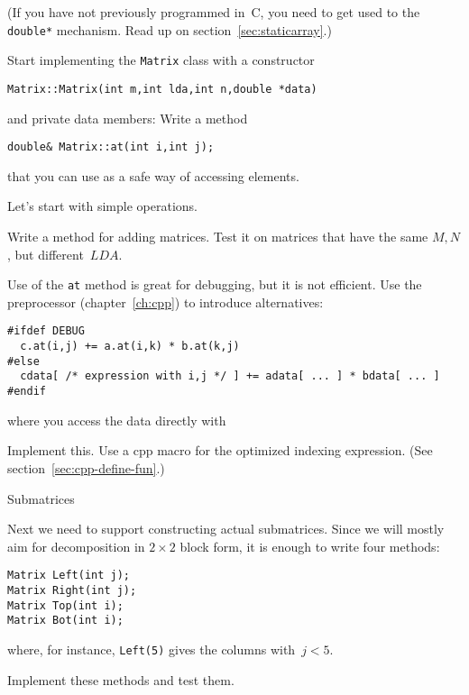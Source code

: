 (If you have not previously programmed in~C, you need to get used to
the \lstinline{double*} mechanism. Read up on
section~\ref{sec:staticarray}.)

\begin{exercise}
  Start implementing the \lstinline{Matrix} class with a constructor
\begin{lstlisting}
Matrix::Matrix(int m,int lda,int n,double *data)
\end{lstlisting}
and private data members:
%
%
Write a method
\begin{lstlisting}
double& Matrix::at(int i,int j);  
\end{lstlisting}
that you can use as a safe way of accessing elements.
\end{exercise}

Let's start with simple operations.
\begin{exercise}
  Write a method for adding matrices. Test it on matrices that have
  the same $M,N$, but different~$\mathord{LDA}$.
\end{exercise}

Use of the \lstinline{at} method is great for debugging, but it is not
efficient. Use the preprocessor (chapter~\ref{ch:cpp}) to introduce
alternatives:
\begin{lstlisting}
#ifdef DEBUG
  c.at(i,j) += a.at(i,k) * b.at(k,j)
#else
  cdata[ /* expression with i,j */ ] += adata[ ... ] * bdata[ ... ]
#endif
\end{lstlisting}
where you access the data directly with
%

\begin{exercise}
  Implement this. Use a cpp  macro for the
  optimized indexing expression. (See section~\ref{sec:cpp-define-fun}.)
\end{exercise}

 {Submatrices}

Next we need to support constructing actual submatrices. Since we will
mostly aim for decomposition in $2\times2$ block form, it is enough to
write four methods:
\begin{lstlisting}
Matrix Left(int j);
Matrix Right(int j);
Matrix Top(int i);
Matrix Bot(int i);
\end{lstlisting}
where, for instance, \lstinline{Left(5)} gives the columns with~$j<5$.

\begin{exercise}
  Implement these methods and test them.
\end{exercise}

